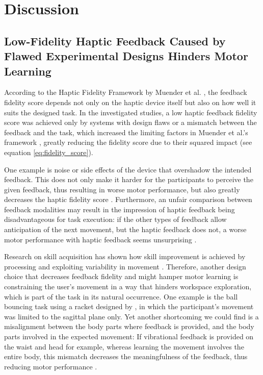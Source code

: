 \section{Discussion}

\subsection{Low-Fidelity Haptic Feedback Caused by Flawed Experimental Designs Hinders Motor Learning}
According to the Haptic Fidelity Framework by Muender et al. \cite{Muender2022HapticReality}, the feedback fidelity score depends not only on the haptic device itself but also on how well it suits the designed task. In the investigated studies, a low haptic feedback fidelity score was achieved only by systems with design flaws or a mismatch between the feedback and the task, which increased the limiting factors in Muender et al.'s framework \cite{Muender2022HapticReality}, greatly reducing the fidelity score due to their squared impact (see equation \ref{eq:fidelity_score}). 

One example is noise or side effects of the device that overshadow the intended feedback. This does not only make it harder for the participants to perceive the given feedback, thus resulting in worse motor performance, but also greatly decreases the haptic fidelity score \cite{Lee2012}. Furthermore, an unfair comparison between feedback modalities may result in the impression of haptic feedback being disadvantageous for task execution: if the other types of feedback allow anticipation of the next movement, but the haptic feedback does not, a worse motor performance with haptic feedback seems unsurprising \cite{Lee2012}.

Research on skill acquisition has shown how skill improvement is achieved by processing and exploiting variability in movement \cite{Sternad2018ItsLearning}. Therefore, another design choice that decreases feedback fidelity and might hamper motor learning is constraining the user's movement in a way that hinders workspace exploration, which is part of the task in its natural occurrence. One example is the ball bouncing task using a racket designed by \cite{Marchal-Crespo2009ReviewInjury}, in which the participant's movement was limited to the sagittal plane only.
Yet another shortcoming we could find is a misalignment between the body parts where feedback is provided, and the body parts involved in the expected movement: If vibrational feedback is provided on the waist and head for example, whereas learning the movement involves the entire body, this mismatch decreases the meaningfulness of the feedback, thus reducing motor performance \cite{Hanashima2023}.

